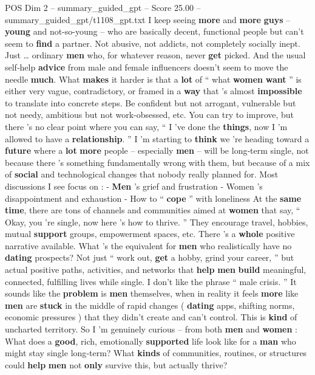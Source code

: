 \begin{textsample}{POS Dim 2 – summary\_guided\_gpt – Score 25.00 – summary\_guided\_gpt/t1108\_gpt.txt}  \label{ex:f2_pos_004}
I keep seeing \textbf{more} and \textbf{more} \textbf{guys} – \textbf{young} and not-so-young – who are basically decent, functional people but can't seem to \textbf{find} a partner.
Not abusive, not addicts, not completely socially inept.
Just … ordinary \textbf{men} who, for whatever reason, never \textbf{get} picked.
And the usual self‑help \textbf{advice} from male and female influencers doesn't seem to move the needle \textbf{much}.
What \textbf{makes} it harder is that a \textbf{lot} of “ what \textbf{women} \textbf{want} ” is either very vague, contradictory, or framed in a \textbf{way} that ’s almost \textbf{impossible} to translate into concrete steps.
Be confident but not arrogant, vulnerable but not needy, ambitious but not work-obsessed, etc.
You can try to improve, but there ’s no clear point where you can say, “ I ’ve done the \textbf{things}, now I ’m allowed to have a \textbf{relationship}. ” I ’m starting to \textbf{think} we ’re heading toward a \textbf{future} where a \textbf{lot} \textbf{more} people – especially \textbf{men} – will be long‑term single, not because there ’s something fundamentally wrong with them, but because of a mix of \textbf{social} and technological changes that nobody really planned for.
Most discussions I see focus on : - \textbf{Men} ’s grief and frustration - Women ’s disappointment and exhaustion - How to “ \textbf{cope} ” with loneliness At the \textbf{same} \textbf{time}, there are tons of channels and communities aimed at \textbf{women} that say, “ Okay, you ’re single, now here ’s how to thrive. ” They encourage travel, hobbies, mutual \textbf{support} groups, empowerment spaces, etc.
There ’s a \textbf{whole} positive narrative available.
What ’s the equivalent for \textbf{men} who realistically have no \textbf{dating} prospects?
Not just “ work out, \textbf{get} a hobby, grind your career, ” but actual positive paths, activities, and networks that \textbf{help} \textbf{men} \textbf{build} meaningful, connected, fulfilling lives while single.
I don't like the phrase “ male crisis. ” It sounds like the \textbf{problem} is \textbf{men} themselves, when in reality it feels \textbf{more} like \textbf{men} are \textbf{stuck} in the middle of rapid changes ( \textbf{dating} apps, shifting norms, economic pressures ) that they didn't create and can't control.
This is \textbf{kind} of uncharted territory.
So I ’m genuinely curious – from both \textbf{men} and \textbf{women} : What does a \textbf{good}, rich, emotionally \textbf{supported} life look like for a \textbf{man} who might stay single long‑term?
What \textbf{kinds} of communities, routines, or structures could \textbf{help} \textbf{men} not \textbf{only} survive this, but actually thrive?

\end{textsample}
